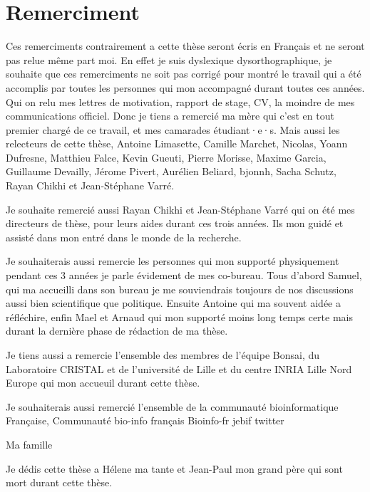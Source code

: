 \documentclass[main.tex]{subfiles}
\begin{document}
\section*{Remerciment}
%

Ces remerciments contrairement a cette thèse seront écris en Français et ne seront pas relue même part moi. En effet je suis dyslexique dysorthographique, je souhaite que ces remerciments ne soit pas corrigé pour montré le travail qui a été accomplis par toutes les personnes qui mon accompagné durant toutes ces années. Qui on relu mes lettres de motivation, rapport de stage, CV, la moindre de mes communications officiel. Donc je tiens a remercié ma mère qui c'est en tout premier chargé de ce travail, et mes camarades étudiant·e·s. Mais aussi les relecteurs de cette thèse, Antoine Limasette, Camille Marchet, Nicolas, Yoann Dufresne, Matthieu Falce, Kevin Gueuti, Pierre Morisse, Maxime Garcia, Guillaume Devailly, Jérome Pivert, Aurélien Beliard, bjonnh, Sacha Schutz, Rayan Chikhi et Jean-Stéphane Varré.

Je souhaite remercié aussi Rayan Chikhi et Jean-Stéphane Varré qui on été mes directeurs de thèse, pour leurs aides durant ces trois années. Ils mon guidé et assisté dans mon entré dans le monde de la recherche.

Je souhaiterais aussi remercie les personnes qui mon supporté physiquement pendant ces 3 années je parle évidement de mes co-bureau. Tous d'abord Samuel, qui ma accueilli dans son bureau je me souviendrais toujours de nos discussions aussi bien scientifique que politique. Ensuite Antoine qui ma souvent aidée a réfléchire, enfin Mael et Arnaud qui mon supporté moins long temps certe mais durant la dernière phase de rédaction de ma thèse.

Je tiens aussi a remercie l'ensemble des membres de l'équipe Bonsai, du Laboratoire CRISTAL et de l'université de Lille et du centre INRIA Lille Nord Europe qui mon accueuil durant cette thèse.

Je souhaiterais aussi remercié l'ensemble de la communauté bioinformatique Française, 
Communauté bio-info français Bioinfo-fr jebif twitter

Ma famille

Je dédis cette thèse a Hélene ma tante et Jean-Paul mon grand père qui sont mort durant cette thèse.
\end{document}
